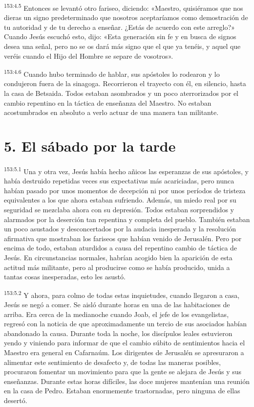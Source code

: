 \par 
\textsuperscript{153:4.5} Entonces se levantó otro fariseo, diciendo: «Maestro, quisiéramos que nos dieras un signo predeterminado que nosotros aceptaríamos como demostración de tu autoridad y de tu derecho a enseñar. ¿Estás de acuerdo con este arreglo?» Cuando Jesús escuchó esto, dijo: «Esta generación sin fe y en busca de signos desea una señal, pero no se os dará más signo que el que ya tenéis, y aquel que veréis cuando el Hijo del Hombre se separe de vosotros».

\par 
\textsuperscript{153:4.6} Cuando hubo terminado de hablar, sus apóstoles lo rodearon y lo condujeron fuera de la sinagoga. Recorrieron el trayecto con él, en silencio, hasta la casa de Betsaida. Todos estaban asombrados y un poco aterrorizados por el cambio repentino en la táctica de enseñanza del Maestro. No estaban acostumbrados en absoluto a verlo actuar de una manera tan militante.

\section*{5. El sábado por la tarde}
\par 
\textsuperscript{153:5.1} Una y otra vez, Jesús había hecho añicos las esperanzas de sus apóstoles, y había destruido repetidas veces sus expectativas más acariciadas, pero nunca habían pasado por unos momentos de decepción ni por unos períodos de tristeza equivalentes a los que ahora estaban sufriendo. Además, un miedo real por su seguridad se mezclaba ahora con su depresión. Todos estaban sorprendidos y alarmados por la deserción tan repentina y completa del pueblo. También estaban un poco asustados y desconcertados por la audacia inesperada y la resolución afirmativa que mostraban los fariseos que habían venido de Jerusalén. Pero por encima de todo, estaban aturdidos a causa del repentino cambio de táctica de Jesús. En circunstancias normales, habrían acogido bien la aparición de esta actitud más militante, pero al producirse como se había producido, unida a tantas cosas inesperadas, esto les asustó.

\par 
\textsuperscript{153:5.2} Y ahora, para colmo de todas estas inquietudes, cuando llegaron a casa, Jesús se negó a comer. Se aisló durante horas en una de las habitaciones de arriba. Era cerca de la medianoche cuando Joab, el jefe de los evangelistas, regresó con la noticia de que aproximadamente un tercio de sus asociados habían abandonado la causa. Durante toda la noche, los discípulos leales estuvieron yendo y viniendo para informar de que el cambio súbito de sentimientos hacia el Maestro era general en Cafarnaúm. Los dirigentes de Jerusalén se apresuraron a alimentar este sentimiento de desafecto y, de todas las maneras posibles, procuraron fomentar un movimiento para que la gente se alejara de Jesús y sus enseñanzas. Durante estas horas difíciles, las doce mujeres mantenían una reunión en la casa de Pedro. Estaban enormemente trastornadas, pero ninguna de ellas desertó.

